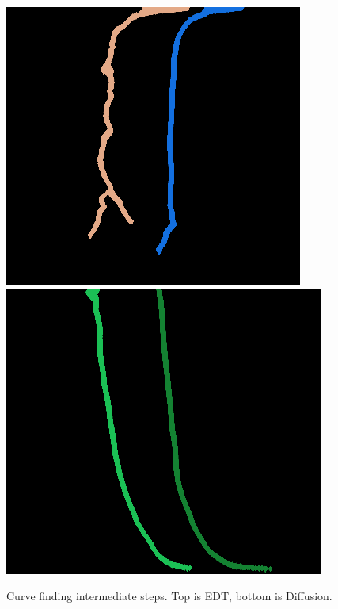 \begin{figure}
    \includegraphics[width=\linewidth]{figures/curves_edt.png}
    \includegraphics[width=\linewidth]{figures/curves_diffusion.png}
    \caption{Curve finding intermediate steps. Top is EDT, bottom is Diffusion.}
    \label{fig:curves}
\end{figure}

